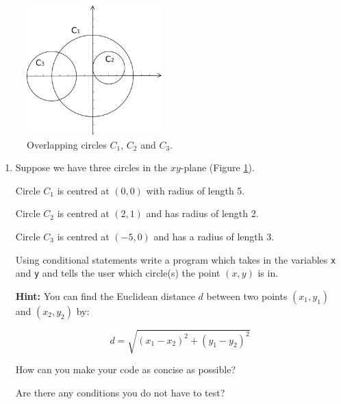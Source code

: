 \documentclass[11pt]{report}
\begin{document}
\begin{figure}[!h]
        \centering
        \includegraphics[height=5cm]{circles}
        \caption{Overlapping circles $C_1$, $C_2$ and $C_3$.}
        \label{fig:circles}
\end{figure}

\begin{enumerate}[label=(\Alph*)]
    
    \item Suppose we have three circles in the $xy$-plane (Figure \ref{fig:circles}). 
    
    Circle $C_1$ is centred at $(0, 0)$ with radius of length 5. 
    
    Circle $C_2$ is centred at $(2, 1)$ and has radius of length 2. 
    
    Circle $C_3$ is centred at $(-5, 0)$ and has a radius of length 3. 
    
    Using conditional statements write a program which takes in the variables {\tt x} and {\tt y} and tells the user which circle(s) the point $(x, y)$ is in. 
    
    {\bf Hint:} You can find the Euclidean distance $d$ between two points $(x_1, y_1)$ and $(x_2, y_2)$ by:
    
    $$d = \sqrt{(x_1 - x_2)^2 + (y_1 - y_2)^2}$$ 
    
    How can you make your code as concise as possible? 
    
    Are there any conditions you do not have to test?
\end{enumerate}


    

    
\end{document}

